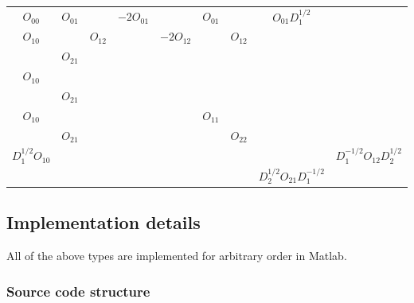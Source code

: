 \begin{tabular}{ccc|cc|cc|cc}
	$O_{00}$               & $O_{01} $   &             & $-2  O_{01}$ &                & $ O_{01}$ &             & $ O_{01}  D_1^{1/2}$           &                                \\
	${O_{10}}$             &             & ${ O_{12}}$ &              & $-2 { O_{12}}$ &           & ${ O_{12}}$ &                                &                                \\
	                       & ${ O_{21}}$ &             &              &                &           &             &                                &                                \\
	\hline
	${O_{10}}$             &             &             &              &                &           &             &                                &                                \\
	                       & ${ O_{21}}$ &             &              &                &           &             &                                &                                \\
	\hline
	${ O_{10}}$            &             &             &              &                & $O_{11}$  &             &                                &                                \\
	                       & ${ O_{21}}$ &             &              &                &           & $O_{22}$    &                                &                                \\
	\hline
	$ D_1^{1/2} { O_{10}}$ &             &             &              &                &           &             &                                & $D_1^{-1/2} O_{12}  D_2^{1/2}$ \\
	                       &             &             &              &                &           &             & $ D_2^{1/2} O_{21} D_1^{-1/2}$                                  \\\end{tabular}


\subsection{Implementation details}

All of the above types are implemented for arbitrary order in Matlab.

\subsubsection{Source code structure}

